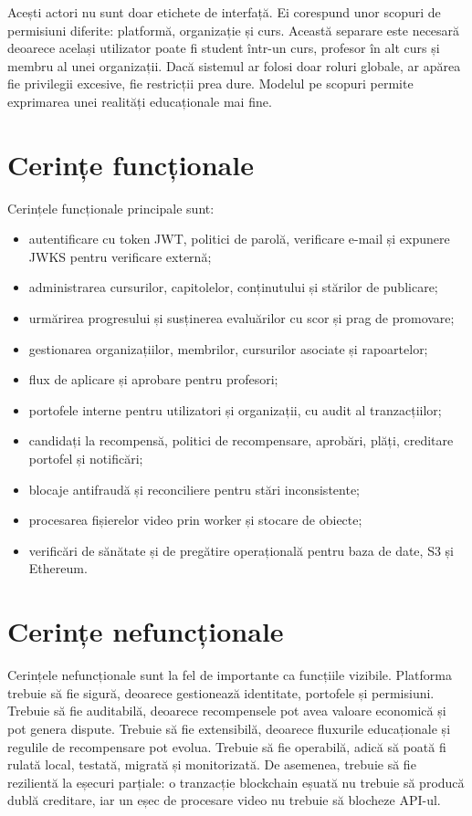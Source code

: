 Acești actori nu sunt doar etichete de interfață. Ei corespund unor scopuri de permisiuni diferite: platformă, organizație și curs. Această separare este necesară deoarece același utilizator poate fi student într-un curs, profesor în alt curs și membru al unei organizații. Dacă sistemul ar folosi doar roluri globale, ar apărea fie privilegii excesive, fie restricții prea dure. Modelul pe scopuri permite exprimarea unei realități educaționale mai fine.

\section{Cerințe funcționale}
Cerințele funcționale principale sunt:

\begin{itemize}[leftmargin=1.4cm]
    \item autentificare cu token JWT, politici de parolă, verificare e-mail și expunere JWKS pentru verificare externă;
    \item administrarea cursurilor, capitolelor, conținutului și stărilor de publicare;
    \item urmărirea progresului și susținerea evaluărilor cu scor și prag de promovare;
    \item gestionarea organizațiilor, membrilor, cursurilor asociate și rapoartelor;
    \item flux de aplicare și aprobare pentru profesori;
    \item portofele interne pentru utilizatori și organizații, cu audit al tranzacțiilor;
    \item candidați la recompensă, politici de recompensare, aprobări, plăți, creditare portofel și notificări;
    \item blocaje antifraudă și reconciliere pentru stări inconsistente;
    \item procesarea fișierelor video prin worker și stocare de obiecte;
    \item verificări de sănătate și de pregătire operațională pentru baza de date, S3 și Ethereum.
\end{itemize}

\section{Cerințe nefuncționale}
Cerințele nefuncționale sunt la fel de importante ca funcțiile vizibile. Platforma trebuie să fie sigură, deoarece gestionează identitate, portofele și permisiuni. Trebuie să fie auditabilă, deoarece recompensele pot avea valoare economică și pot genera dispute. Trebuie să fie extensibilă, deoarece fluxurile educaționale și regulile de recompensare pot evolua. Trebuie să fie operabilă, adică să poată fi rulată local, testată, migrată și monitorizată. De asemenea, trebuie să fie rezilientă la eșecuri parțiale: o tranzacție blockchain eșuată nu trebuie să producă dublă creditare, iar un eșec de procesare video nu trebuie să blocheze API-ul.

